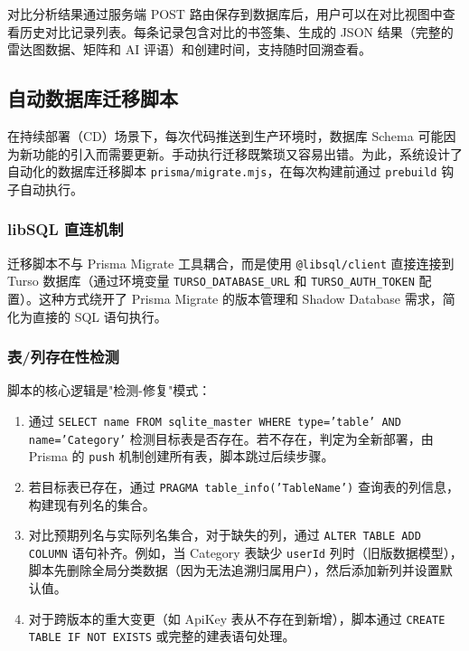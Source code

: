 \documentclass[12pt,a4paper]{ctexart}
\begin{document}
对比分析结果通过服务端 POST 路由保存到数据库后，用户可以在对比视图中查看历史对比记录列表。每条记录包含对比的书签集、生成的 JSON 结果（完整的雷达图数据、矩阵和 AI 评语）和创建时间，支持随时回溯查看。

\subsection{自动数据库迁移脚本}

在持续部署（CD）场景下，每次代码推送到生产环境时，数据库 Schema 可能因为新功能的引入而需要更新。手动执行迁移既繁琐又容易出错。为此，系统设计了自动化的数据库迁移脚本 \texttt{prisma/migrate.mjs}，在每次构建前通过 \texttt{prebuild} 钩子自动执行。

\subsubsection{libSQL 直连机制}

迁移脚本不与 Prisma Migrate 工具耦合，而是使用 \texttt{@libsql/client} 直接连接到 Turso 数据库（通过环境变量 \texttt{TURSO\_DATABASE\_URL} 和 \texttt{TURSO\_AUTH\_TOKEN} 配置）。这种方式绕开了 Prisma Migrate 的版本管理和 Shadow Database 需求，简化为直接的 SQL 语句执行\cite{ref:turso}。

\subsubsection{表/列存在性检测}

脚本的核心逻辑是"检测-修复"模式：

\begin{enumerate}
  \item 通过 \texttt{SELECT name FROM sqlite\_master WHERE type='table' AND name='Category'} 检测目标表是否存在。若不存在，判定为全新部署，由 Prisma 的 \texttt{push} 机制创建所有表，脚本跳过后续步骤。
  \item 若目标表已存在，通过 \texttt{PRAGMA table\_info('TableName')} 查询表的列信息，构建现有列名的集合。
  \item 对比预期列名与实际列名集合，对于缺失的列，通过 \texttt{ALTER TABLE ADD COLUMN} 语句补齐。例如，当 Category 表缺少 \texttt{userId} 列时（旧版数据模型），脚本先删除全局分类数据（因为无法追溯归属用户），然后添加新列并设置默认值。
  \item 对于跨版本的重大变更（如 ApiKey 表从不存在到新增），脚本通过 \texttt{CREATE TABLE IF NOT EXISTS} 或完整的建表语句处理。
\end{enumerate}
\end{document}
